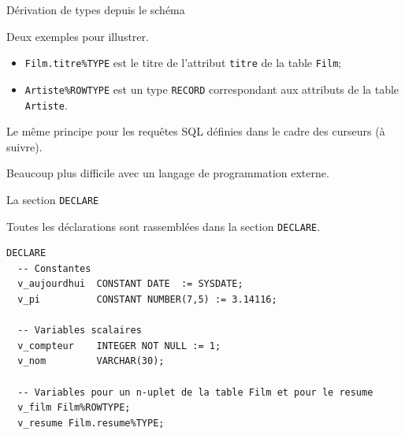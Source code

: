 \begin{frame}[fragile]{Dérivation de types depuis le schéma}

Deux exemples pour illustrer.
\begin{itemize}

  \item \texttt{Film.titre\%TYPE} est le titre de l'attribut
     \texttt{titre} de la table \texttt{Film};

  \item \texttt{Artiste\%ROWTYPE} est  un type \texttt{RECORD} 
      correspondant aux attributs de la table \texttt{Artiste}.
\end{itemize}

\vfill

Le même principe pour les \alert{requêtes SQL} définies dans le cadre des curseurs (à suivre).

\vfill

\alert{Beaucoup plus difficile avec un langage de programmation externe.}

\end{frame}


\begin{frame}[fragile]{La section \texttt{DECLARE}}

Toutes les déclarations sont rassemblées dans la section \texttt{DECLARE}.

\begin{scriptsize}
\begin{verbatim}
DECLARE
  -- Constantes
  v_aujourdhui  CONSTANT DATE  := SYSDATE;
  v_pi          CONSTANT NUMBER(7,5) := 3.14116;

  -- Variables scalaires
  v_compteur    INTEGER NOT NULL := 1;
  v_nom         VARCHAR(30);

  -- Variables pour un n-uplet de la table Film et pour le resume
  v_film Film%ROWTYPE;
  v_resume Film.resume%TYPE;
\end{verbatim}
\end{scriptsize}

\end{frame}


